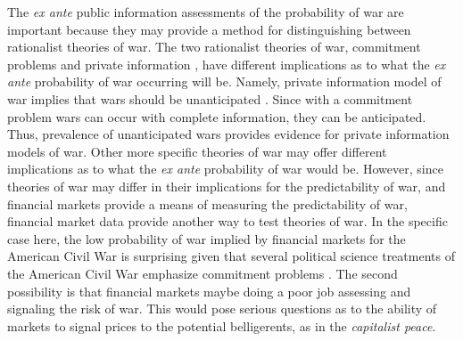 The \textit{ex ante} public information assessments of the probability of war are important because they may provide a method for distinguishing between rationalist theories of war.
The two rationalist theories of war, commitment problems and private information \parencites{Fearon1995,Powell2006}, have different implications as to what the \textit{ex ante} probability of war occurring will be.
Namely, private information model of war implies that wars should be unanticipated \parencite{Gartzke1999}.
Since with a commitment problem wars can occur with complete information, they can be anticipated.
Thus, prevalence of unanticipated wars provides evidence for private information models of war.
Other more specific theories of war may offer different implications as to what the \textit{ex ante} probability of war would be.
However, since theories of war may differ in their implications for the predictability of war, and financial markets provide a means of measuring the predictability of war, financial market data provide another way to test theories of war.
In the specific case here, the low probability of war implied by financial markets for the American Civil War is surprising given that several political science treatments of the American Civil War emphasize commitment problems \parencites{Reiter2009}{Weingast1998}{Poast2012}.
The second possibility is that financial markets maybe doing a poor job assessing and signaling the risk of war.
This would pose serious questions as to the ability of markets to signal prices to the potential belligerents, as in the \textit{capitalist peace}.

